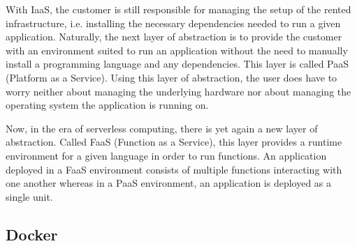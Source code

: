 With IaaS, the customer is still responsible for managing the setup of the rented infrastructure,
i.e. installing the necessary dependencies needed to run a given application. Naturally, the next
layer of abstraction is to provide the customer with an environment suited to run an application
without the need to manually install a programming language and any dependencies. This layer is
called PaaS (Platform as a Service). Using this layer of abstraction, the user does have to worry
neither about managing the underlying hardware nor about managing the operating system the
application is running on.

Now, in the era of serverless computing, there is yet again a new layer of abstraction. Called
FaaS (Function as a Service), this layer provides a runtime environment for a given language in
order to run functions. An application deployed in a FaaS environment consists of multiple
functions interacting with one another whereas in a PaaS environment, an application is deployed
as a single unit.

\subsection{Docker}

